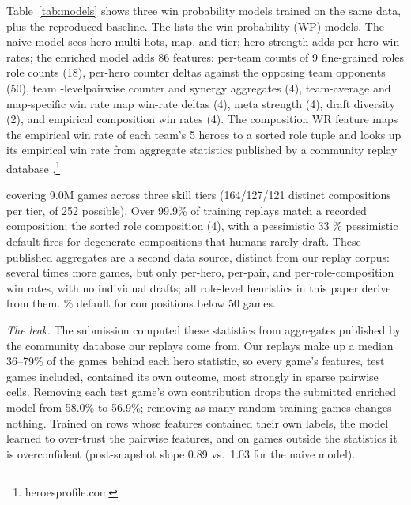 \documentclass[journal]{IEEEtran}
\providecommand{\DIFaddtex}[1]{{\protect\color{blue} \sf #1}} %
\providecommand{\DIFdeltex}[1]{{\protect\color{red} \scriptsize #1}} %
\providecommand{\DIFaddbegin}{} %
\providecommand{\DIFaddend}{} %
\providecommand{\DIFdelbegin}{} %
\providecommand{\DIFdelend}{} %
\providecommand{\DIFadd}[1]{\texorpdfstring{\DIFaddtex{#1}}{#1}} %
\providecommand{\DIFdel}[1]{\texorpdfstring{\DIFdeltex{#1}}{}} %
\begin{document}
Table~\ref{tab:models} \DIFdelbegin \DIFdel{shows three win probability models trained on the same data, plus the reproduced baseline. The }\DIFdelend \DIFaddbegin \DIFadd{lists the win probability (WP) models. The naive model sees hero multi-hots, map, and tier; hero strength adds per-hero win rates; the }\DIFaddend enriched model adds 86 features: \DIFdelbegin \DIFdel{per-team counts of 9 fine-grained roles }\DIFdelend \DIFaddbegin \DIFadd{role counts }\DIFaddend (18), per-hero counter deltas against the \DIFdelbegin \DIFdel{opposing team }\DIFdelend \DIFaddbegin \DIFadd{opponents }\DIFaddend (50), team\DIFdelbegin \DIFdel{-level}\DIFdelend  pairwise counter and synergy aggregates (4), team-average and \DIFdelbegin \DIFdel{map-specific win rate }\DIFdelend \DIFaddbegin \DIFadd{map win-rate }\DIFaddend deltas (4), meta strength (4), draft diversity (2), and \DIFdelbegin \DIFdel{empirical composition win rates (4). The composition WR feature maps }\DIFdelend \DIFaddbegin \DIFadd{the empirical win rate of }\DIFaddend each team's \DIFdelbegin \DIFdel{5 heroes to a sorted role tuple and looks up its empirical win rate from aggregate statistics published by a community replay database ,}\footnote{\DIFdel{heroesprofile.com}} %
\addtocounter{footnote}{-1}%
\DIFdel{covering 9.0M games across three skill tiers (164/127/121 distinct compositions per tier, of 252 possible). Over 99.9\% of training replays match a recorded composition; the }\DIFdelend \DIFaddbegin \DIFadd{sorted role composition (4), with a pessimistic }\DIFaddend 33\DIFdelbegin \DIFdel{\% pessimistic default fires for degenerate compositions that humans rarely draft.
These published aggregates are a second data source, distinct from our replay corpus: several times more games, but only per-hero, per-pair, and per-role-composition win rates, with no individual drafts; all role-level heuristics in this paper derive from them.
}\DIFdelend \DIFaddbegin \DIFadd{\% default for compositions below 50 games.
}\DIFaddend 

\DIFaddbegin \DIFadd{\textit{The leak.} The submission computed these statistics from aggregates published by the community database our replays come from. Our replays make up a median 36--79\% of the games behind each hero statistic, so every game's features, test games included, contained its own outcome, most strongly in sparse pairwise cells. Removing each test game's own contribution drops the submitted enriched model from 58.0\% to 56.9\%; removing as many random training games changes nothing. Trained on rows whose features contained their own labels, the model learned to over-trust the pairwise features, and on games outside the statistics it is overconfident (post-snapshot slope 0.89 vs.\ 1.03 for the naive model).
}
\end{document}
